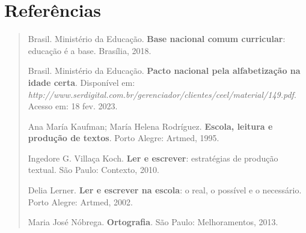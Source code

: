 \chapter{Referências}

\begin{quote}
Brasil. Ministério da Educação. \textbf{Base nacional comum curricular}:
educação é a base. Brasília, 2018.

Brasil. Ministério da Educação. \textbf{Pacto nacional pela
alfabetização na idade certa}. Disponível em:
\emph{http://www.serdigital.com.br/gerenciador/clientes/ceel/material/149.pdf}.
Acesso em: 18 fev. 2023.

Ana María Kaufman; María Helena Rodríguez. \textbf{Escola, leitura e
produção de textos}. Porto Alegre: Artmed, 1995.

Ingedore G. Villaça Koch. \textbf{Ler e escrever}: estratégias de
produção textual. São Paulo: Contexto, 2010.

Delia Lerner. \textbf{Ler e escrever na escola}: o real, o possível e o
necessário. Porto Alegre: Artmed, 2002.

Maria José Nóbrega. \textbf{Ortografia}. São Paulo: Melhoramentos, 2013.
\end{quote}